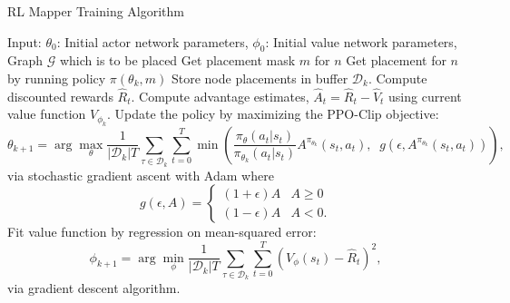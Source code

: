 
\begin{algorithm*}
  \caption{RL Mapper Training Algorithm}
  \label{alg1}
\begin{algorithmic}[1]
  \STATE Input: $\theta_0$: Initial actor network parameters, $\phi_0$: Initial value network parameters, Graph $\mathcal{G}$ which is to be placed
    \STATE Get placement mask $m$ for $n$
    \STATE Get placement for $n$ by running policy $\pi(\theta_k, m)$
    \STATE Store node placements in buffer ${\mathcal D}_k$.
  \ENDFOR
  \ENDFOR
  \STATE Compute discounted rewards $\hat{R}_t$.
  \STATE Compute advantage estimates, $\hat{A}_t = \hat{R}_t - \hat{V}_t$ using current value function $V_{\phi_k}$.
  \STATE Update the policy by maximizing the PPO-Clip objective:
      \begin{equation*}
        \theta_{k+1} = \arg \max_{\theta} \frac{1}{|{\mathcal D}_k| T} \sum_{\tau \in {\mathcal D}_k} \sum_{t=0}^T \min\left(
            \frac{\pi_{\theta}(a_t|s_t)}{\pi_{\theta_k}(a_t|s_t)}  A^{\pi_{\theta_k}}(s_t,a_t), \;\;
            g(\epsilon, A^{\pi_{\theta_k}}(s_t,a_t))
        \right),
      \end{equation*}
      via stochastic gradient ascent with Adam where
      \begin{equation*}
        g(\epsilon, A) = \left\{ 
          \begin{array}{ll}
          (1 + \epsilon) A & A \geq 0 \\
          (1 - \epsilon) A & A < 0.
          \end{array}
          \right.
      \end{equation*}
  \STATE Fit value function by regression on mean-squared error:
      \begin{equation*}
      \phi_{k+1} = \arg \min_{\phi} \frac{1}{|{\mathcal D}_k| T} \sum_{\tau \in {\mathcal D}_k} \sum_{t=0}^T\left( V_{\phi} (s_t) - \hat{R}_t \right)^2,
      \end{equation*}
      via gradient descent algorithm.
  \ENDFOR
\end{algorithmic}
\end{algorithm*}
